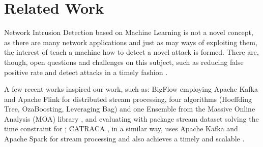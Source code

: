 
\section{Related Work}
\label{sec:related}

Network Intrusion Detection based on Machine Learning is not a novel concept,
as there are many network applications and just as may %
ways of exploiting them,
the interest of teach a machine how to detect a novel attack is formed.
There are, though, open questions and challenges on this subject, such as
reducing false positive rate and detect attacks in a timely fashion \cite{DaCosta2019a}.

A few recent works inspired our work, such as: BigFlow \cite{Viegas2019}
employing Apache Kafka and Apache Flink for distributed stream processing,
four algorithms (Hoeffding Tree, OzaBoosting, Leveraging Bag) and one Ensemble
from the Massive Online Analysis (MOA) library \cite{MOA}, and
evaluating with package stream dataset solving the time constraint for \nids;
CATRACA \cite{Lopez2018,AndreoniLopez2019a}, in a similar way, uses 
Apache Kafka and Apache Spark for stream processing and also achieves
a timely and scalable \nids.



